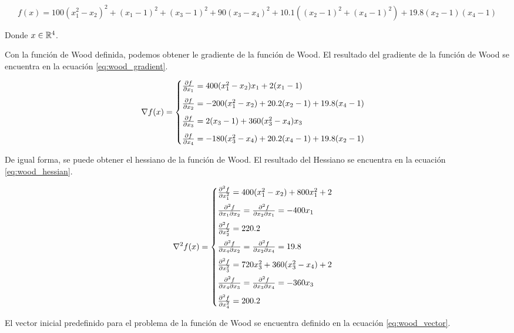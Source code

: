 \begin{equation}
    f(x) = 100(x_1^2-x_2)^2+(x_1-1)^2+(x_3-1)^2+90(x_3-x_4)^2 +10.1((x_2-1)^2+(x_4-1)^2)+19.8(x_2-1)(x_4-1) \label{eq:wood}
\end{equation}

Donde $x\in \mathbb{R}^4$.

Con la función de Wood definida, podemos obtener le gradiente de la función de Wood. El resultado del gradiente de la función de Wood se encuentra en la ecuación \ref{eq:wood_gradient}.

\begin{equation}
    \nabla f(x) = \begin{cases}
        \frac{\partial f}{\partial x_1}=400(x_1^2-x_2)x_1 +2(x_1-1)             \\[0.25cm]
        \frac{\partial f}{\partial x_2}=-200(x_1^2-x_2)+20.2(x_2-1)+19.8(x_4-1) \\[0.25cm]
        \frac{\partial f}{\partial x_3}=2(x_3-1)+360(x_3^2-x_4)x_3              \\[0.25cm]
        \frac{\partial f}{\partial x_4}=-180(x_3^2-x_4)+20.2(x_4-1)+19.8(x_2-1)
    \end{cases} \label{eq:wood_gradient}
\end{equation}

De igual forma, se puede obtener el hessiano de la función de Wood. El resultado del Hessiano se encuentra en la ecuación \ref{eq:wood_hessian}.

\begin{equation}
    \nabla^2 f(x) = \begin{cases}
        \frac{\partial^2 f}{\partial x_1^2} = 400(x_1^2-x_2)+800x_1^2+2             \\[0.25cm]
        \frac{\partial^2 f}{\partial x_1 \partial x_2} =\frac{\partial^2 f}{\partial x_2 \partial x_1} = -400x_1 \\[0.25cm]
        \frac{\partial^2 f}{\partial x_2^2} = 220.2                                 \\[0.25cm]
        \frac{\partial^2 f}{\partial x_4 \partial x_2} = \frac{\partial^2 f}{\partial x_2 \partial x_4} = 19.8   \\[0.25cm]
        \frac{\partial^2 f}{\partial x_3^2} = 720x_3^2+360(x_3^2-x_4)+2             \\[0.25cm]
        \frac{\partial^2 f}{\partial x_4 \partial x_3}=\frac{\partial^2 f}{\partial x_3 \partial x_4} = -360x_3  \\[0.25cm]
        \frac{\partial^2 f}{\partial x_4^2} = 200.2
    \end{cases} \label{eq:wood_hessian}
\end{equation}

El vector inicial predefinido para el problema de la función de Wood se encuentra definido en la ecuación \ref{eq:wood_vector}.


